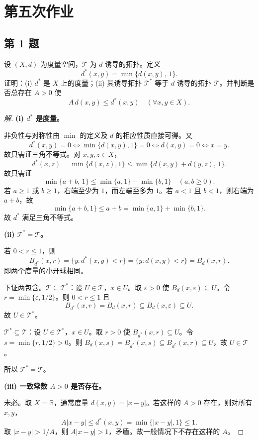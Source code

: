 \documentclass[11pt,a4paper]{article}
\newcommand{\R}{\mathbb{R}}
\theoremstyle{definition}
\newenvironment{solution}{\begin{proof}[解]}{\end{proof}}
\begin{document}
\section{第五次作业}

\subsection{第 1 题}

设 $(X, d)$ 为度量空间，$\mathcal{T}$ 为 $d$ 诱导的拓扑。定义
\[
  d^*(x,y) = \min\{d(x,y),\,1\}.
\]
证明：(i) $d^*$ 是 $X$ 上的度量；(ii) 其诱导拓扑 $\mathcal{T}^*$ 等于 $d$ 诱导的拓扑 $\mathcal{T}$。并判断是否总存在 $A > 0$ 使
\[
  A\,d(x,y) \le d^*(x,y) \quad (\forall x,y \in X).
\]

\begin{solution}
\textbf{(i) $d^*$ 是度量。}

非负性与对称性由 $\min$ 的定义及 $d$ 的相应性质直接可得。又
\[
  d^*(x,y) = 0 \iff \min\{d(x,y),1\} = 0 \iff d(x,y) = 0 \iff x = y.
\]
故只需证三角不等式。对 $x,y,z \in X$，
\[
  d^*(x,z) = \min\{d(x,z),1\} \le \min\{d(x,y)+d(y,z),\,1\}.
\]
故只需证
\[
  \min\{a+b,\,1\} \le \min\{a,1\} + \min\{b,1\} \quad (a,b \ge 0).
\]
若 $a \ge 1$ 或 $b \ge 1$，右端至少为 $1$，而左端至多为 $1$。若 $a < 1$ 且 $b < 1$，则右端为 $a+b$，故
\[
  \min\{a+b,1\} \le a+b = \min\{a,1\} + \min\{b,1\}.
\]
故 $d^*$ 满足三角不等式。

\textbf{(ii) $\mathcal{T}^* = \mathcal{T}$。}

若 $0 < r \le 1$，则
\[
  B_{d^*}(x,r) = \{y : d^*(x,y) < r\} = \{y : d(x,y) < r\} = B_d(x,r).
\]
即两个度量的小开球相同。

下证两包含。$\mathcal{T} \subseteq \mathcal{T}^*$：设 $U \in \mathcal{T}$，$x \in U$。取 $\varepsilon > 0$ 使 $B_d(x,\varepsilon) \subseteq U$。令 $r = \min\{\varepsilon,1/2\}$。则 $0 < r \le 1$ 且
\[
  B_{d^*}(x,r) = B_d(x,r) \subseteq B_d(x,\varepsilon) \subseteq U.
\]
故 $U \in \mathcal{T}^*$。

$\mathcal{T}^* \subseteq \mathcal{T}$：设 $U \in \mathcal{T}^*$，$x \in U$。取 $r > 0$ 使 $B_{d^*}(x,r) \subseteq U$。令 $s = \min\{r,1/2\} > 0$。则 $B_d(x,s) = B_{d^*}(x,s) \subseteq B_{d^*}(x,r) \subseteq U$，故 $U \in \mathcal{T}$。

所以 $\mathcal{T}^* = \mathcal{T}$。

\textbf{(iii) 一致常数 $A > 0$ 是否存在。}

未必。取 $X = \R$，通常度量 $d(x,y) = |x-y|$。若这样的 $A > 0$ 存在，则对所有 $x,y$，
\[
  A|x-y| \le d^*(x,y) = \min\{|x-y|,1\} \le 1.
\]
取 $|x-y| > 1/A$，则 $A|x-y| > 1$，矛盾。故一般情况下不存在这样的 $A$。
\end{solution}
\end{document}

